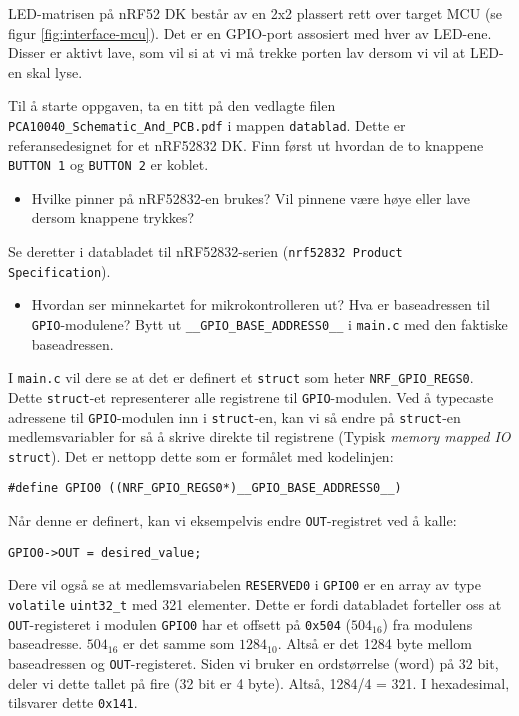 LED-matrisen på nRF52 DK består av en 2x2 plassert rett over target MCU (se figur \ref{fig:interface-mcu}). Det er en GPIO-port assosiert med hver av LED-ene. Disser er aktivt lave, som vil si at vi må trekke porten lav dersom vi vil at LED-en skal lyse.

Til å starte oppgaven, ta en titt på den vedlagte filen \verb|PCA10040_Schematic_And_PCB.pdf| i mappen \verb|datablad|. Dette er referansedesignet for et nRF52832 DK. Finn først ut hvordan de to knappene \verb|BUTTON 1| og \verb|BUTTON 2| er koblet. 

\begin{itemize}
    \item Hvilke pinner på nRF52832-en brukes? Vil pinnene være høye eller lave dersom knappene trykkes?
\end{itemize}


Se deretter i databladet til nRF52832-serien (\texttt{nrf52832 Product Specification}). 

\begin{itemize}
    \item Hvordan ser minnekartet for mikrokontrolleren ut? Hva er baseadressen til \verb|GPIO|-modulene? Bytt ut \verb|__GPIO_BASE_ADDRESS0__| i \verb|main.c| med den faktiske baseadressen. 
\end{itemize}

I \verb|main.c| vil dere se at det er definert et \verb|struct| som heter \verb|NRF_GPIO_REGS0|. Dette \verb|struct|-et representerer alle registrene til \verb|GPIO|-modulen. Ved å typecaste adressene til \verb|GPIO|-modulen inn i \verb|struct|-en, kan vi så endre på \verb|struct|-en medlemsvariabler for så å skrive direkte til registrene (Typisk \textit{memory mapped IO} \verb|struct|). Det er nettopp dette som er formålet med kodelinjen:

\verb|#define GPIO0 ((NRF_GPIO_REGS0*)__GPIO_BASE_ADDRESS0__)|

Når denne er definert, kan vi eksempelvis endre \verb|OUT|-registret ved å kalle:

\verb|GPIO0->OUT = desired_value;|\newline

 Dere vil også se at medlemsvariabelen \verb|RESERVED0| i \verb|GPIO0| er en array av type \verb|volatile| \verb|uint32_t| med 321 elementer. Dette er fordi databladet forteller oss at \verb|OUT|-registeret i modulen \verb|GPIO0| har et offsett på 
 \verb|0x504| ($\text{504}_{\text{16}}$) fra modulens baseadresse. $\text{504}_{\text{16}}$ er det samme som $\text{1284}_{\text{10}}$. Altså er det 1284 byte mellom baseadressen og \verb|OUT|-registeret. Siden vi bruker en ordstørrelse (word) på 32 bit, deler vi dette tallet på fire (32 bit er 4 byte). Altså, 1284/4 = 321. I hexadesimal, tilsvarer dette \verb|0x141|.

